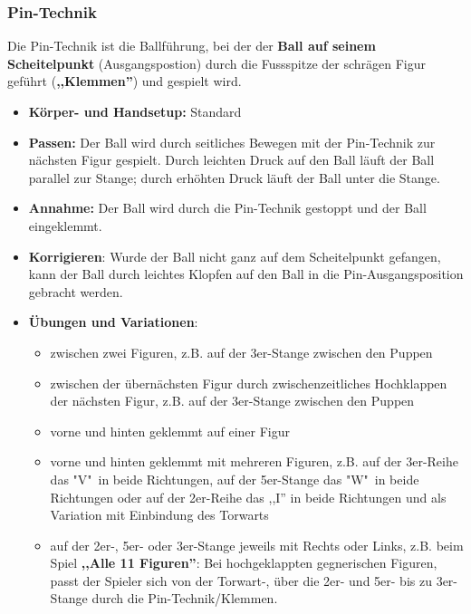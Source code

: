 \subsubsection{Pin-Technik}
\label{technik:offensive:eine:pin}
Die Pin-Technik ist die Ballführung, bei der der \textbf{Ball auf seinem Scheitelpunkt} (Ausgangspostion) durch die Fussspitze der schrägen Figur geführt (\textbf{,,Klemmen''}) und gespielt wird.
\begin{itemize}
    \item \textbf{Körper- und Handsetup:} Standard 
    \item \textbf{Passen:} Der Ball wird durch seitliches Bewegen mit der Pin-Technik zur nächsten Figur gespielt. 
        Durch leichten Druck auf den Ball läuft der Ball parallel zur Stange; 
        durch erhöhten Druck läuft der Ball unter die Stange.
    \item \textbf{Annahme:} Der Ball wird durch die Pin-Technik gestoppt und der Ball eingeklemmt.
    \item \textbf{Korrigieren}: Wurde der Ball nicht ganz auf dem Scheitelpunkt gefangen, kann der Ball durch leichtes Klopfen auf den Ball in die Pin-Ausgangsposition gebracht werden.
    \item \textbf{Übungen und Variationen}:
        \begin{itemize}
            \item zwischen zwei Figuren, z.B. auf der 3er-Stange zwischen den Puppen
            \item zwischen der übernächsten Figur durch zwischenzeitliches Hochklappen der nächsten Figur, z.B. auf der 3er-Stange zwischen den Puppen
            \item vorne und hinten geklemmt auf einer Figur
            \item vorne und hinten geklemmt mit mehreren Figuren, z.B. auf der 3er-Reihe das "V"\  in beide Richtungen, auf der 5er-Stange das "W"\ in beide Richtungen oder auf der 2er-Reihe das ,,I'' in beide Richtungen und als Variation mit Einbindung des Torwarts
            \item auf der 2er-, 5er- oder 3er-Stange jeweils mit Rechts oder Links, z.B. beim Spiel \textbf{,,Alle 11 Figuren''}: Bei hochgeklappten gegnerischen Figuren, passt der Spieler sich von der Torwart-, über die 2er- und 5er- bis zu 3er-Stange durch die Pin-Technik/Klemmen. 
        \end{itemize}
\end{itemize}

